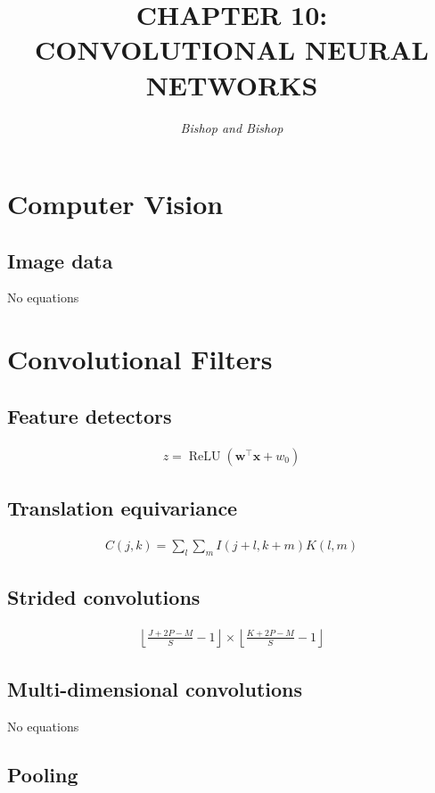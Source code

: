 \documentclass{article}
\title{\LARGE\scshape\MakeUppercase{Chapter 10: Convolutional Neural Networks}}
\author{\textit{Bishop and Bishop}}
\date{}
\begin{document}
\maketitle

\section{Computer Vision}

\subsection{Image data}
No equations

\section{Convolutional Filters}

\subsection{Feature detectors}
\begin{align*}
z = \operatorname{ReLU}\left(\mathbf{w}^{\top} \mathbf{x} + w_0\right) \tag{10.1}
\end{align*}

\subsection{Translation equivariance}
\begin{align*}
C(j, k) = \sum_{l} \sum_{m} I(j + l, k + m) K(l, m) \tag{10.2}
\end{align*}

\subsection{Strided convolutions}
\begin{align*}
\left\lfloor \frac{J + 2 P - M}{S} - 1 \right\rfloor \times \left\lfloor \frac{K + 2 P - M}{S} - 1 \right\rfloor \tag{10.5}
\end{align*}

\subsection{Multi-dimensional convolutions}

No equations

\subsection{Pooling}
\end{document}
